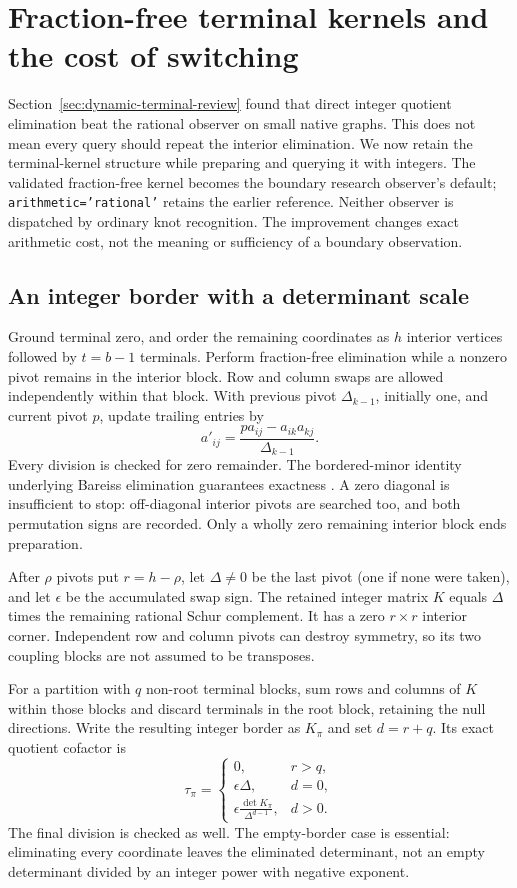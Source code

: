 \section{Fraction-free terminal kernels and the cost of switching}
\label{sec:integer-terminal}

Section~\ref{sec:dynamic-terminal-review} found that direct integer quotient
elimination beat the rational observer on small native graphs. This does not
mean every query should repeat the interior elimination. We now retain the
terminal-kernel structure while preparing and querying it with integers.
The validated fraction-free kernel becomes the boundary research observer's
default; \texttt{arithmetic='rational'} retains the earlier reference. Neither
observer is dispatched by ordinary knot recognition. The improvement changes
exact arithmetic cost, not the meaning or sufficiency of a boundary observation.

\subsection{An integer border with a determinant scale}

Ground terminal zero, and order the remaining coordinates as $h$ interior
vertices followed by $t=b-1$ terminals. Perform fraction-free elimination
while a nonzero pivot remains in the interior block. Row and column swaps
are allowed independently within that block. With previous pivot
$\Delta_{k-1}$, initially one, and current pivot $p$, update trailing entries by
\[
 a'_{ij}=\frac{p a_{ij}-a_{ik}a_{kj}}{\Delta_{k-1}}.
\]
Every division is checked for zero remainder. The bordered-minor identity
underlying Bareiss elimination guarantees exactness \cite{bareiss-terminal}.
A zero diagonal is insufficient to stop: off-diagonal interior pivots are
searched too, and both permutation signs are recorded. Only a wholly zero
remaining interior block ends preparation.

After $\rho$ pivots put $r=h-\rho$, let $\Delta\ne0$ be the last pivot
(one if none were taken), and let $\epsilon$ be the accumulated swap sign.
The retained integer matrix $K$ equals $\Delta$ times the remaining rational
Schur complement. It has a zero $r\times r$ interior corner. Independent
row and column pivots can destroy symmetry, so its two coupling blocks are
not assumed to be transposes.

For a partition with $q$ non-root terminal blocks, sum rows and columns of
$K$ within those blocks and discard terminals in the root block, retaining
the null directions. Write the resulting integer border as $K_\pi$ and set
$d=r+q$. Its exact quotient cofactor is
\[
 \tau_\pi=\begin{cases}
 0,&r>q,\\
 \epsilon\Delta,&d=0,\\
 \displaystyle\epsilon\frac{\det K_\pi}{\Delta^{d-1}},&d>0.
 \end{cases}
\]
The final division is checked as well. The empty-border case is essential:
eliminating every coordinate leaves the eliminated determinant, not an empty
determinant divided by an integer power with negative exponent.


